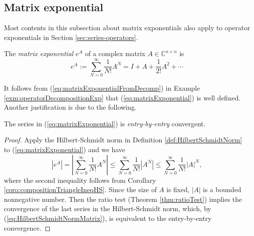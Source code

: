 \subsection{Matrix exponential}
\label{sec:matrix-exponential}

\begin{rem}
  Most contents in this subsection %
  about matrix exponentials
  also apply to operator exponentials in Section \ref{sec:series-operators}.
\end{rem}

\begin{defn}
  \label{def:matrixExponential}
  The \emph{matrix exponential} $e^{A}$
  of a complex matrix $A\in \mathbb{C}^{n\times n}$ is 
  \begin{equation}
    \label{eq:matrixExponential}
    e^{A} 
    := \sum_{N=0}^{\infty}\frac{1}{N!}A^N
    = I + A + \frac{1}{2!}A^2 + \cdots
  \end{equation}
\end{defn}

\begin{rem}
  It follows from (\ref{eq:matrixExponentialFromDecomp})
  in Example \ref{exm:operatorDecompositionExp} that
  (\ref{eq:matrixExponential}) is well defined.
  Another justification is due to the following. 
\end{rem}

\begin{lem}
  \label{lem:expMatConverges}
  The series in (\ref{eq:matrixExponential}) is 
  \emph{entry-by-entry} convergent.
\end{lem}
\begin{proof}
  Apply the Hilbert-Schmidt norm
  in Definition \ref{def:HilbertSchmidtNorm}
  to (\ref{eq:matrixExponential})
  and we have
  \begin{displaymath}
    \left|e^{A}\right|
    = \left|\sum_{N=0}^{\infty}\frac{1}{N!}A^N\right|
    \le \sum_{N=0}^{\infty}\frac{1}{N!}\left|A^N\right|
    \le \sum_{N=0}^{\infty}\frac{1}{N!}\left|A\right|^N,
  \end{displaymath}
  where the second inequality follows from Corollary
  \ref{coro:compositionTriangleIneqHS}. 
  Since the size of $A$ is fixed,
  $|A|$ is a bounded nonnegative number.
  Then the ratio test (Theorem \ref{thm:ratioTest}) implies
   the convergence of the last series in the Hilbert-Schmidt norm,
   which,
   by (\ref{eq:HilbertSchmidtNormMatrix}), %
   is equivalent to
   the entry-by-entry convergence.
\end{proof}

